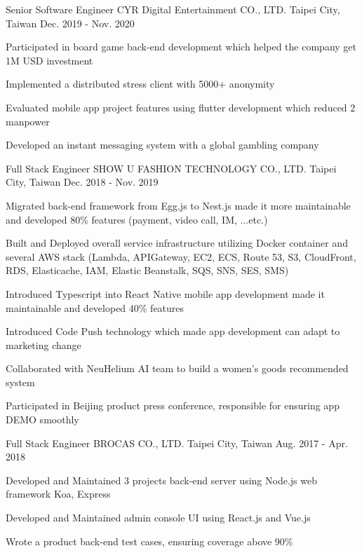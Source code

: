 \begin{cventries}
  \cventry
    {Senior Software Engineer} %
    {CYR Digital Entertainment CO., LTD.} %
    {Taipei City, Taiwan} %
    {Dec. 2019 - Nov. 2020} %
    {
      \begin{cvitems} %
        \item {Participated in board game back-end development which helped the company get 1M USD investment}
        \item {Implemented a distributed stress client with 5000+ anonymity}
        \item {Evaluated mobile app project features using flutter development which reduced 2 manpower}
        \item {Developed an instant messaging system with a global gambling company}
      \end{cvitems}
    }

  \cventry
    {Full Stack Engineer} %
    {SHOW U FASHION TECHNOLOGY CO., LTD.} %
    {Taipei City, Taiwan} %
    {Dec. 2018 - Nov. 2019} %
    {
      \begin{cvitems} %
        \item {Migrated back-end framework from Egg.js to Nest.js made it more maintainable and developed 80\% features (payment, video call, IM, ...etc.)}
        \item {Built and Deployed overall service infrastructure utilizing Docker container and several AWS stack (Lambda, APIGateway, EC2, ECS, Route 53, S3, CloudFront, RDS, Elasticache, IAM, Elastic Beanstalk, SQS, SNS, SES, SMS)}
        \item {Introduced Typescript into React Native mobile app development made it maintainable and developed 40\% features }
        \item {Introduced Code Push technology which made app development can adapt to marketing change}
        \item {Collaborated with NeuHelium AI team to build a women's goods recommended system}
        \item {Participated in Beijing product press conference, responsible for ensuring app DEMO smoothly}
      \end{cvitems}
    }

  \cventry
    {Full Stack Engineer} %
    {BROCAS CO., LTD.} %
    {Taipei City, Taiwan} %
    {Aug. 2017 - Apr. 2018} %
    {
      \begin{cvitems} %
        \item {Developed and Maintained 3 projects back-end server using Node.js web framework Koa, Express}
        \item {Developed and Maintained admin console UI using React.js and Vue.js}
        \item {Wrote a product back-end test cases, ensuring coverage above 90\%}
      \end{cvitems}
    }


\end{cventries}
